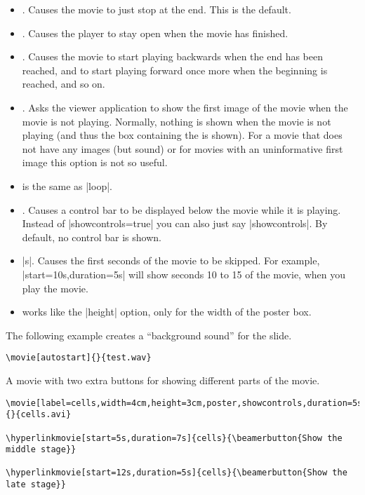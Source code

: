 \begin{command}{\movie{}}
\begin{itemize}
  \item
    . Causes the movie to just stop at the end. This is the default.
  \item
    . Causes the player to stay open when the movie has finished.
  \item
    . Causes the movie to start playing backwards when the end has been reached, and to start playing forward once more when the beginning is reached, and so on.
  \item
    . Asks the viewer application to show the first image of the movie when the movie is not playing. Normally, nothing is shown when the movie is not playing (and thus the box containing the  is shown). For a movie that does not have any images (but sound) or for movies with an uninformative first image this option is not so useful.
  \item
     is the same as |loop|.
  \item
    . Causes a control bar to be displayed below the movie while it is playing. Instead of |showcontrols=true| you can also just say |showcontrols|. By default, no control bar is shown.
  \item
    |s|. Causes the first  seconds of the movie to be skipped. For example, |start=10s,duration=5s| will show seconds 10 to 15 of the movie, when you play the movie.
  \item
     works like the |height| option, only for the width of the poster box.
  \end{itemize}

  \example
  The following example creates a ``background sound'' for the slide.

\begin{verbatim}
\movie[autostart]{}{test.wav}
\end{verbatim}

  \example
  A movie with two extra buttons for showing different parts of the movie.

\begin{verbatim}
\movie[label=cells,width=4cm,height=3cm,poster,showcontrols,duration=5s]{}{cells.avi}

\hyperlinkmovie[start=5s,duration=7s]{cells}{\beamerbutton{Show the middle stage}}

\hyperlinkmovie[start=12s,duration=5s]{cells}{\beamerbutton{Show the late stage}}
\end{verbatim}
\end{command}

